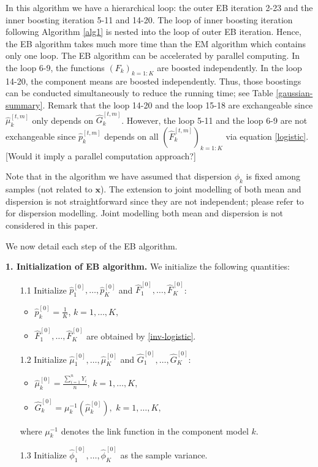 \documentclass[11pt]{article}
\numberwithin{equation}{section}
\def\bx{\boldsymbol{x}}
\begin{document}
In this algorithm we have a hierarchical loop: the outer EB iteration 2-23 and the inner boosting iteration 5-11 and 14-20.
The loop of inner boosting iteration following Algorithm \ref{alg1} is nested into the loop of outer EB iteration.
Hence, the EB algorithm takes much more time than the EM algorithm which contains only one loop.
The EB algorithm can be accelerated by parallel computing.
In the loop 6-9, the functions $(F_k)_{k=1:K}$ are boosted independently. 
In the loop 14-20, the component means are boosted independently.
Thus, those  boostings can be conducted simultaneously to reduce the running time; see Table \ref{gaussian-summary}.
Remark that the loop 14-20 and the loop 15-18  are exchangeable since $\hat{\mu}_k^{[t,m]}$ only depends on $\hat{G}_k^{[t,m]}$. However, the loop 5-11 and the loop 6-9 are not exchangeable since $\hat{p}_k^{[t,m]}$ depends on all $(\hat{F}_k^{[t,m]})_{k=1:K}$ via equation \eqref{logistic}.
{\color{blue}[Would it imply a parallel computation approach?]}

Note that  in the algorithm we have assumed that dispersion $\phi_k$ is fixed among samples (not related to $\bx$). The extension to joint modelling of both mean and dispersion  is not straightforward since they are not independent; please refer to \citet{jorgensen:1997} for dispersion modelling.
Joint modelling both mean and dispersion is not considered in this paper. 

We now detail each step of the EB algorithm.

{\bf 1. Initialization of EB algorithm.} We initialize the following quantities:
	\begin{enumerate}
		\item[1.1] Initialize $\hat{p}_1^{[0]}, \ldots,\hat{p}_K^{[0]}$ and   $\hat{F}_1^{[0]}, \ldots, \hat{F}_{K}^{[0]}$:
		
		\begin{itemize}
			\item 	$\hat{p}_k^{[0]}=\frac{1}{K}$, $k=1,\ldots,K,$
			\item $\hat{F}_1^{[0]}, \ldots, \hat{F}_{K}^{[0]}$ are obtained by \eqref{inv-logistic}.
		\end{itemize}
		\item[1.2]
		Initialize $\hat{\mu}_1^{[0]},\ldots,\hat{\mu}_K^{[0]}$ and  $\hat{G}_1^{[0]},\ldots,\hat{G}_K^{[0]}$:
		\begin{itemize}
			\item $\hat{\mu}_k^{[0]}=\frac{\sum_{i=1}^nY_i}{n}$, $k=1,\ldots,K,$
			\item $\hat{G}_k^{[0]}=\mu_k^{-1}(\hat{\mu}_k^{[0]}),$  $k=1,\ldots,K,$
		\end{itemize}
	where $\mu^{-1}_k$ denotes the link function in the component model $k$.
		\item[1.3] Initialize $\hat{\phi}_1^{[0]},\ldots, \hat{\phi}_K^{[0]}$ as the sample variance. 
	\end{enumerate}
\end{document}
